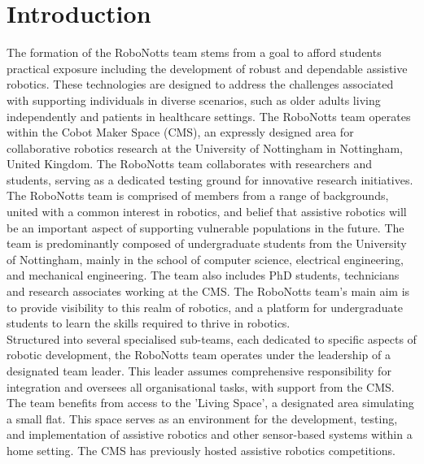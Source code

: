 \section{Introduction}

The formation of the RoboNotts team stems from a goal to afford students practical exposure including the development of robust and dependable assistive robotics. These technologies are designed to address the challenges associated with supporting individuals in diverse scenarios, such as older adults living independently and patients in healthcare settings. The RoboNotts team operates within the Cobot Maker Space (CMS), an expressly designed area for collaborative robotics research at the University of Nottingham in Nottingham, United Kingdom. The RoboNotts team collaborates with researchers and students, serving as a dedicated testing ground for innovative research initiatives.\\
The RoboNotts team is comprised of members from a range of backgrounds, united with a common interest in robotics, and belief that assistive robotics will be an important aspect of supporting vulnerable populations in the future. The team is predominantly composed of undergraduate students from the University of Nottingham, mainly in the school of computer science, electrical engineering, and mechanical engineering. The team also includes PhD students, technicians and research associates working at the CMS. The RoboNotts team's main aim is to provide visibility to this realm of robotics, and a platform for undergraduate students to learn the skills required to thrive in robotics. \\
Structured into several specialised sub-teams, each dedicated to specific aspects of robotic development, the RoboNotts team operates under the leadership of a designated team leader. This leader assumes comprehensive responsibility for integration and oversees all organisational tasks, with support from the CMS. The team benefits from access to the 'Living Space', a designated area simulating a small flat. This space serves as an environment for the development, testing, and implementation of assistive robotics and other sensor-based systems within a home setting. The CMS has previously hosted assistive robotics competitions. 